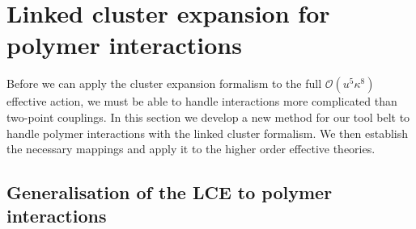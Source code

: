 \section{Linked cluster expansion for polymer interactions}

Before we can apply the cluster expansion formalism to the full $\mathcal{O}(u^5
\kappa^8)$ effective action, we must be able to handle interactions more
complicated than two-point couplings. In this section we develop a new method
for our tool belt to handle polymer interactions with the linked cluster
formalism. We then establish the necessary mappings and apply it to the higher
order effective theories.

\subsection{Generalisation of the LCE to polymer interactions}

